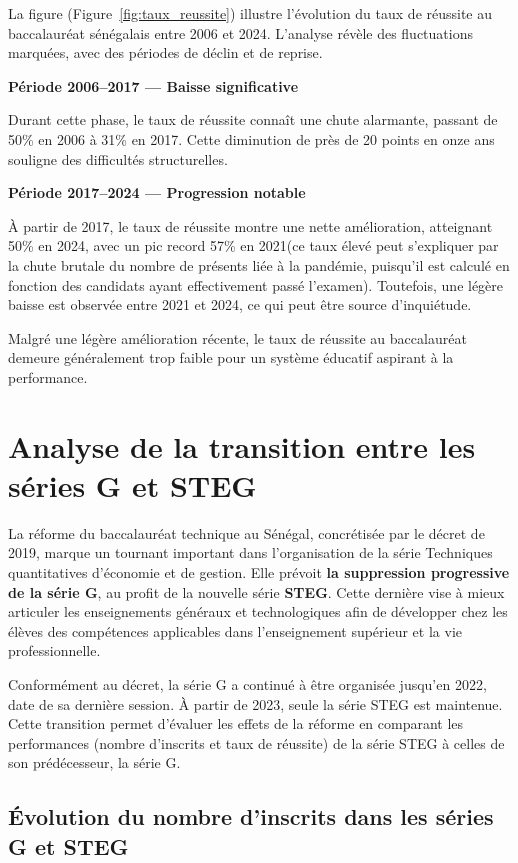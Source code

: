 La figure (Figure~\ref{fig:taux_reussite}) illustre l’évolution du taux de réussite au baccalauréat sénégalais entre 2006 et 2024. 
L’analyse révèle des fluctuations marquées, avec des périodes de déclin et de reprise.


\textbf{Période 2006–2017 — Baisse significative}

Durant cette phase, le taux de réussite connaît une chute alarmante, passant de 50\% en 2006 à 31\% en 2017. 
Cette diminution de près de 20 points en onze ans souligne des difficultés structurelles.

\textbf{Période 2017–2024 — Progression notable}

À partir de 2017, le taux de réussite montre une nette amélioration, atteignant 50\% en 2024, avec un pic record 57\% en 2021(ce taux élevé peut s'expliquer par la chute brutale du nombre de présents liée à la pandémie, puisqu'il est calculé en fonction des candidats ayant effectivement passé l’examen). 
Toutefois, une légère baisse est observée entre 2021 et 2024, ce qui peut être source d’inquiétude.

\bigskip

Malgré une légère amélioration récente, le taux de réussite au baccalauréat demeure généralement trop faible pour un système éducatif aspirant à la performance.

\newpage
\section{Analyse de la transition entre les séries G et STEG}

La réforme du baccalauréat technique au Sénégal, concrétisée par le décret de 2019, marque un tournant important dans l’organisation de la série Techniques quantitatives d’économie et de gestion.
Elle prévoit \textbf{la suppression progressive de la série G}, au profit de la nouvelle série \textbf{STEG}.
Cette dernière vise à mieux articuler les enseignements généraux et technologiques afin de développer chez les élèves des compétences applicables dans l’enseignement supérieur et la vie professionnelle.

Conformément au décret, la série G a continué à être organisée jusqu’en 2022, date de sa dernière session. À partir de 2023, seule la série STEG est maintenue. 
Cette transition permet d’évaluer les effets de la réforme en comparant les performances (nombre d’inscrits et taux de réussite) de la série STEG à celles de son prédécesseur, la série G.

\subsection{Évolution du nombre d'inscrits dans les séries G et STEG}

